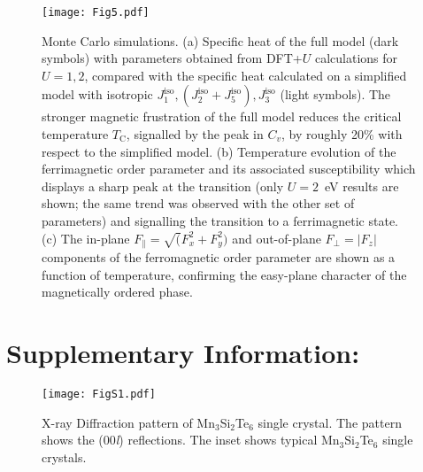 \documentclass[preprint,amsmath,amssymb,aps,nofootinbib,superscriptaddress]{revtex4-2}
\begin{document}
\begin{figure*}
\texttt{[image: Fig5.pdf]}
\caption{\label{fig:figMC} 
Monte Carlo simulations. (a) Specific heat of the full model (dark symbols) with parameters obtained from DFT+$U$ calculations for $U=1,2$, compared with the specific heat calculated on a simplified model with isotropic $J_1^{\mathrm{iso}}, (J_2^{\mathrm{iso}}+J_5^{\mathrm{iso}}),J_3^{\mathrm{iso}}$ (light symbols). The stronger magnetic frustration of the full model reduces the critical temperature $T_\mathrm{C}$, signalled by the peak in $C_v$, by roughly 20\% with respect to the simplified model. (b) Temperature evolution of the ferrimagnetic order parameter and its associated susceptibility which displays a sharp peak at the transition (only $U=2$~eV results are shown; the same trend was observed with the other set of parameters) and signalling the transition to a ferrimagnetic state. (c) The in-plane $F_\parallel=\sqrt(F_x^2+F_y^2)$ and out-of-plane $F_\perp=\vert F_z \vert$ components of the ferromagnetic order parameter are shown as a function of temperature, confirming the easy-plane character of the magnetically ordered phase. }
\end{figure*}

\clearpage
\section{Supplementary Information:}

\renewcommand{\thefigure}{S\arabic{figure}}   
\renewcommand{\figurename}{Supplementary Figure}

\begin{figure}[!h]
\texttt{[image: FigS1.pdf]}
\caption{\label{fig:figS2} X-ray Diffraction pattern of Mn$_{3}$Si$_{2}$Te$_{6}$ single crystal. The pattern shows the (00\emph{l}) reflections. The inset shows typical Mn$_{3}$Si$_{2}$Te$_{6}$ single crystals.}
\end{figure}
\end{document}
